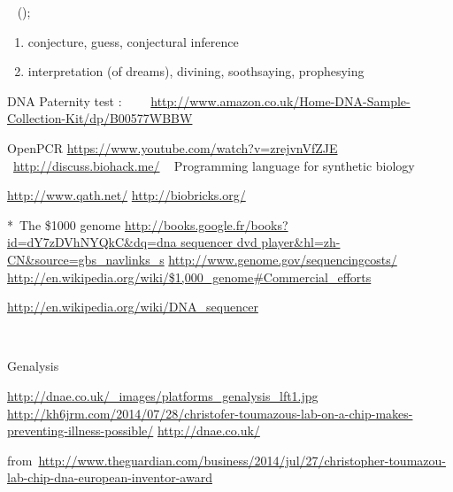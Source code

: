 ~
();
\liststyleLvi
\begin{enumerate}
\item conjecture, guess, conjectural inference 
\item interpretation (of dreams), divining, soothsaying, prophesying 
\end{enumerate}


\bigskip

DNA Paternity test :
~~~~\url{http://www.amazon.co.uk/Home-DNA-Sample-Collection-Kit/dp/B00577WBBW}

\bigskip

OpenPCR
\url{https://www.youtube.com/watch?v=zrejvnVfZJE}
~\url{http://discuss.biohack.me/}
~
Programming language for synthetic biology

\url{http://www.qath.net/}
\url{http://biobricks.org/}
~

*~The \$1000 genome
\url{http://books.google.fr/books?id=dY7zDVhNYQkC&dq=dna sequencer dvd
player&hl=zh-CN&source=gbs_navlinks_s}
\url{http://www.genome.gov/sequencingcosts/}
\href{http://en.wikipedia.org/wiki/$1,000_genome#Commercial_efforts}{http://en.wikipedia.org/wiki/\$1,000\_genome\#Commercial\_efforts}

\bigskip
\url{http://en.wikipedia.org/wiki/DNA_sequencer}

~

\bigskip
Genalysis

\url{http://dnae.co.uk/_images/platforms_genalysis_lft1.jpg}
\url{http://kh6jrm.com/2014/07/28/christofer-toumazous-lab-on-a-chip-makes-preventing-illness-possible/}
\url{http://dnae.co.uk/}

\bigskip
{}
from~\url{http://www.theguardian.com/business/2014/jul/27/christopher-toumazou-lab-chip-dna-european-inventor-award}

